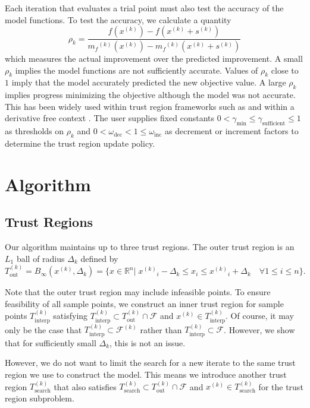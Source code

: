 \documentclass{article}
\theoremstyle{case}
\newcommand{\xk}{{x^{(k)}}}
\newcommand{\Rn}{\mathbb R^n}
\newcommand{\dk}{\Delta_k}
\newcommand{\mfk}{{{m}_f}^{(k)}}
\newcommand{\sk}{{{s}^{(k)}}}
\newcommand{\outertrk}{{T_{\text{out}}^{(k)}}}
\newcommand{\searchtrk}{{T_{\text{search}}^{(k)}}}
\newcommand{\sampletrk}{{T_{\text{interp}}^{(k)}}}
\newcommand{\feasible}{{\mathcal F}}
\newcommand{\feasiblek}{{\mathcal F^{(k)}}}
\newcommand{\gammasm}{\gamma_{\text{min}}}
\newcommand{\gammabi}{\gamma_{\text{sufficient}}}
\newcommand{\tr}{{ B_{\infty}\left(\xk, \dk\right) }}
\begin{document}
Each iteration that evaluates a trial point must also test the accuracy of the model functions.
To test the accuracy, we calculate a quantity
\begin{equation}
\label{rho}
\rho_k = \frac{f(\xk) - f(\xk+\sk)}{\mfk(\xk) - \mfk(\xk+\sk)}
\end{equation}
which measures the actual improvement over the predicted improvement.
A small $\rho_k$ implies the model functions are not sufficiently accurate.
Values of $\rho_k$ close to $1$ imply that the model accurately predicted the new objective value.
A large $\rho_k$ implies progress minimizing the objective although the model was not accurate.
This has been widely used within trust region frameworks such as \cite{Conn:2000:TM:357813} and within a derivative free context \cite{DUMMY:intro_book}.
The user supplies fixed constants $0 < \gammasm \le \gammabi \le 1$ as thresholds on $\rho_k$ and $0 < \omega_{\text{dec}} < 1 \le \omega_{\text{inc}}$ as decrement or increment factors to determine the trust region update policy.


\section{Algorithm}

\subsection{Trust Regions}
Our algorithm maintains up to three trust regions.
The outer trust region is an $L_1$ ball of radius $ \dk $ defined by
\begin{equation}
\label{trust_region}
\outertrk = \tr = \{x\in \Rn | \; {\xk}_i - \dk \le x_i \le {\xk}_i + \dk \quad \forall 1\le i \le n\}.
\end{equation}

Note that the outer trust region may include infeasible points.
To ensure feasibility of all sample points, we construct an inner trust region for sample points $ \sampletrk $  satisfying 
$\sampletrk \subset \outertrk \cap \feasible$ and $\xk \in \sampletrk $.
Of course, it may only be the case that $\sampletrk \subset \feasiblek$ rather than $\sampletrk \subset \feasible$.
However, we show that for sufficiently small $\dk$, this is not an issue.

However, we do not want to limit the search for a new iterate to the same trust region we use to construct the model.
This means we introduce another trust region $ \searchtrk $ that also satisfies $ \searchtrk \subset \outertrk \cap \feasible$ and $\xk \in \searchtrk $ for the trust region subproblem.
\end{document}
